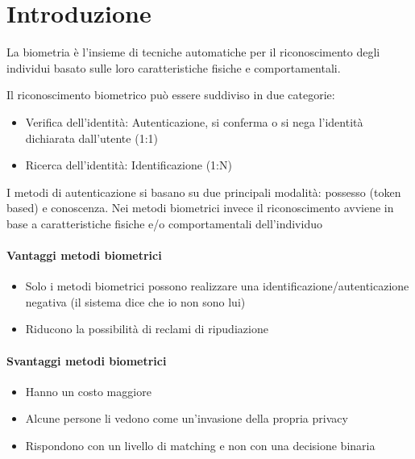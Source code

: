 \section{Introduzione}
La biometria è l’insieme di tecniche automatiche per il riconoscimento degli individui basato sulle loro caratteristiche fisiche e comportamentali.

Il riconoscimento biometrico può essere suddiviso in due categorie:
\begin{itemize}
    \item Verifica dell’identità: Autenticazione, si conferma o si nega l’identità dichiarata dall’utente (1:1)
    \item Ricerca dell’identità: Identificazione (1:N)
\end{itemize}

I metodi di autenticazione si basano su due principali modalità: possesso (token based) e conoscenza. Nei metodi biometrici invece il riconoscimento avviene in base a caratteristiche fisiche e/o comportamentali dell’individuo

\paragraph{Vantaggi metodi biometrici}
\begin{itemize}
    \item Solo i metodi biometrici possono realizzare una identificazione/autenticazione negativa (il sistema dice che io non sono lui)
    \item Riducono la possibilità di reclami di ripudiazione
\end{itemize}

\paragraph{Svantaggi metodi biometrici}
\begin{itemize}
    \item Hanno un costo maggiore
    \item Alcune persone li vedono come un’invasione della propria privacy
    \item Rispondono con un livello di matching e non con una decisione binaria 
\end{itemize}

